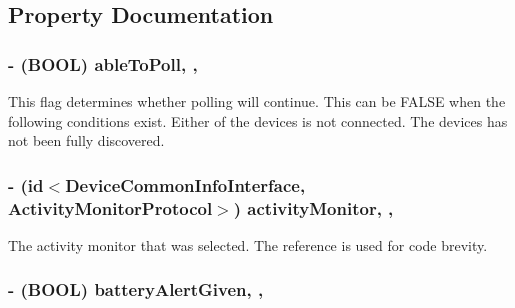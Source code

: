 \subsection{Property Documentation}
\hypertarget{interface_device_poll_manager_abe71cba97ae5b0faef77e70b78f2bef2}{
\subsubsection[{able\-To\-Poll}]{\setlength{\rightskip}{0pt plus 5cm}-\/ (B\-O\-O\-L) able\-To\-Poll\hspace{0.3cm}{\ttfamily [read]}, {\ttfamily [write]}, {\ttfamily [atomic]}}}\label{interface_device_poll_manager_abe71cba97ae5b0faef77e70b78f2bef2}
This flag determines whether polling will continue. This can be F\-A\-L\-S\-E when the following conditions exist. Either of the devices is not connected. The devices has not been fully discovered. \hypertarget{interface_device_poll_manager_a1e33e8f7da83c22dccb6c3b3b7d66069}{
\subsubsection[{activity\-Monitor}]{\setlength{\rightskip}{0pt plus 5cm}-\/ (id$<${\bf Device\-Common\-Info\-Interface}, {\bf Activity\-Monitor\-Protocol}$>$) activity\-Monitor\hspace{0.3cm}{\ttfamily [read]}, {\ttfamily [write]}, {\ttfamily [atomic]}}}\label{interface_device_poll_manager_a1e33e8f7da83c22dccb6c3b3b7d66069}
The activity monitor that was selected. The reference is used for code brevity. \hypertarget{interface_device_poll_manager_a8d5b5ff2c336f0dd2cb2b9e088850072}{
\subsubsection[{battery\-Alert\-Given}]{\setlength{\rightskip}{0pt plus 5cm}-\/ (B\-O\-O\-L) battery\-Alert\-Given\hspace{0.3cm}{\ttfamily [read]}, {\ttfamily [write]}, {\ttfamily [atomic]}}}\label{interface_device_poll_manager_a8d5b5ff2c336f0dd2cb2b9e088850072}
